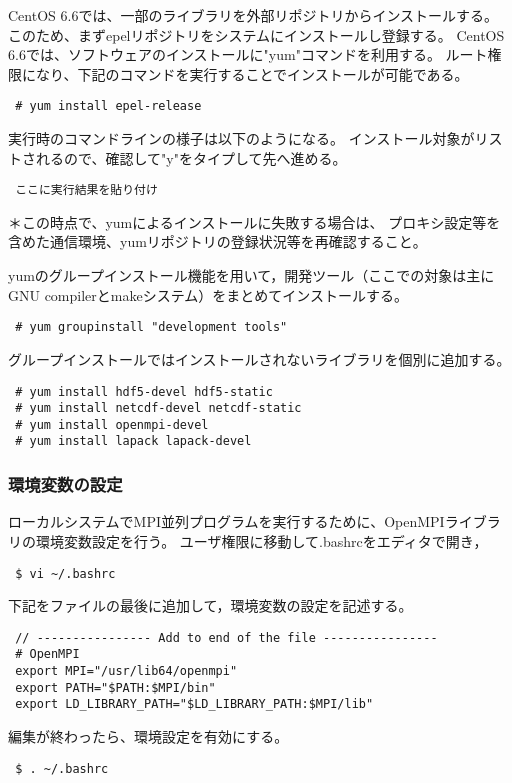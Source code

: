 CentOS 6.6では、一部のライブラリを外部リポジトリからインストールする。
このため、まずepelリポジトリをシステムにインストールし登録する。
CentOS 6.6では、ソフトウェアのインストールに"yum"コマンドを利用する。
ルート権限になり、下記のコマンドを実行することでインストールが可能である。
\begin{verbatim}
 # yum install epel-release
\end{verbatim}
実行時のコマンドラインの様子は以下のようになる。
インストール対象がリストされるので、確認して"y"をタイプして先へ進める。
\begin{verbatim}
 ここに実行結果を貼り付け
\end{verbatim}
{\small ＊この時点で、yumによるインストールに失敗する場合は、
プロキシ設定等を含めた通信環境、yumリポジトリの登録状況等を再確認すること。}

\noindent yumのグループインストール機能を用いて，開発ツール（ここでの対象は主にGNU compilerとmakeシステム）をまとめてインストールする。
\begin{verbatim}
 # yum groupinstall "development tools"
\end{verbatim}

\noindent グループインストールではインストールされないライブラリを個別に追加する。
\begin{verbatim}
 # yum install hdf5-devel hdf5-static
 # yum install netcdf-devel netcdf-static
 # yum install openmpi-devel
 # yum install lapack lapack-devel
\end{verbatim}




\subsubsection{環境変数の設定}

ローカルシステムでMPI並列プログラムを実行するために、OpenMPIライブラリの環境変数設定を行う。
ユーザ権限に移動して.bashrcをエディタで開き，
\begin{verbatim}
 $ vi ~/.bashrc
\end{verbatim}
下記をファイルの最後に追加して，環境変数の設定を記述する。
\begin{verbatim}
 // ---------------- Add to end of the file ----------------
 # OpenMPI
 export MPI="/usr/lib64/openmpi"
 export PATH="$PATH:$MPI/bin"
 export LD_LIBRARY_PATH="$LD_LIBRARY_PATH:$MPI/lib"
\end{verbatim}
編集が終わったら、環境設定を有効にする。
\begin{verbatim}
 $ . ~/.bashrc
\end{verbatim}


